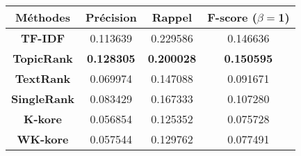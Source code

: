 \begin{tabular}{|c|c|c|c|}
\hline 
\textbf{Méthodes} & \textbf{Précision} & \textbf{Rappel} & \textbf{F-score ($\beta=$1)} \\ 
\hline 
\textbf{TF-IDF} & 0.113639 & 0.229586 & 0.146636 \\ 
\hline 
\textbf{TopicRank} & \textbf{0.128305} & \textbf{0.200028} & \textbf{0.150595} \\ 
\hline 
\textbf{TextRank} & 0.069974 & 0.147088 & 0.091671 \\ 
\hline 
\textbf{SingleRank} & 0.083429 & 0.167333 & 0.107280 \\ 
\hline 
\textbf{K-kore} & 0.056854 & 0.125352 & 0.075728 \\ 
\hline 
\textbf{WK-kore} & 0.057544 & 0.129762 & 0.077491 \\ 
\hline 
\end{tabular}